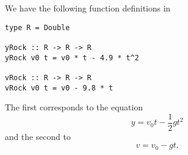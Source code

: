 
We have the following function definitions in 
\scriptsize\begin{verbatim}
type R = Double

yRock :: R -> R -> R
yRock v0 t = v0 * t - 4.9 * t^2

vRock :: R -> R -> R
vRock v0 t = v0 - 9.8 * t
\end{verbatim}\normalsize
The first corresponds to the equation
\[
    y = v_0 t - \frac{1}{2}g t^2
\]
and the second to
\[
    v = v_0 - gt.
\]
